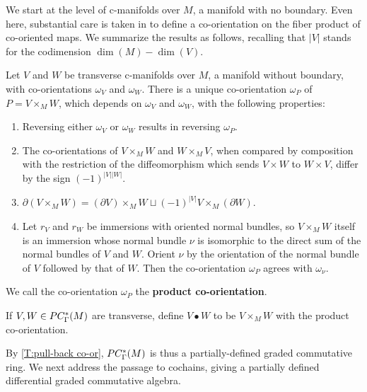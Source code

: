 We start at the level of c-manifolds over $M$, a manifold with no boundary.
Even here, substantial care is taken in \cite[Section 3.5.2]{medina2022foundations} to define a co-orientation on the fiber product of co-oriented maps.
We summarize the results as follows, recalling that $|V|$ stands for the codimension $\dim(M)-\dim(V)$.

\begin{theorem}\label{T:pull-back co-or}
	Let $V$ and $W$ be transverse c-manifolds over $M$, a manifold without boundary,
	with co-orientations $\omega_V$ and $\omega_W$.
	There is a unique co-orientation $\omega_P$ of $P = V \times_M W$, which depends on $\omega_V$ and $\omega_W$, with the following properties:
	\begin{enumerate}
		\item Reversing either $\omega_V$ or $\omega_W$ results in reversing $\omega_P$.
		\item The co-orientations of $V \times_M W$ and $W \times_M V$, when compared by composition with the restriction of the diffeomorphism which sends
		$V \times W$ to $W \times V$, differ by the sign $(-1)^{|V||W|}$.
		\item $\partial ( V \times_M W) = (\partial V) \times_M W \sqcup (-1)^{|V|} V \times_M (\partial W)$.
		\item Let $r_V$ and $r_W$ be immersions with oriented normal bundles, so $V \times_M W$ itself is an immersion whose
		normal bundle $\nu$ is isomorphic to the direct sum of the normal bundles of $V$ and $W$.
		Orient $\nu$ by the orientation of the normal bundle of $V$ followed by that of $W$.
		Then the co-orientation $\omega_P$ agrees with $\omega_{\nu}$.
	\end{enumerate}
\end{theorem}

We call the co-orientation $\omega_P$ the {\bf product co-orientation}.

\begin{definition}
	If $V, W \in PC_\Gamma^*(M)$ are transverse, define $V \bullet W$ to be $V \times_M W$ with the product co-orientation.
\end{definition}

By \cref{T:pull-back co-or}, $ PC_\Gamma^*(M)$ is thus a partially-defined graded commutative ring.
We next address the passage to cochains, giving a partially defined differential graded commutative algebra.

